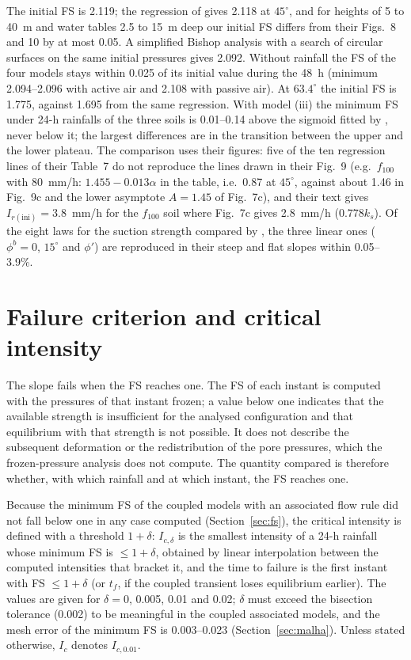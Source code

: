 \documentclass[preprint,12pt,authoryear]{elsarticle}
\newcommand{\Ic}{I_c}
\newcommand{\Icd}{I_{c,\delta}}
\begin{document}
The initial FS is 2.119; the regression of \citet[Table~7]{rahardjo2007} gives 2.118 at $45^\circ$, and for heights
of 5 to 40~m and water tables 2.5 to 15~m deep our initial FS differs from their Figs.~8 and 10 by at most 0.05. A
simplified Bishop analysis with a search of circular surfaces on the same initial pressures gives 2.092. Without
rainfall the FS of the four models stays within 0.025 of its initial value during the 48~h (minimum 2.094--2.096
with active air and 2.108 with passive air). At
$63.4^\circ$ the initial FS is 1.775, against 1.695 from the same regression. With model (iii) the minimum FS under
24-h rainfalls of the three soils is 0.01--0.14 above the sigmoid fitted by \citet[Eq.~6 and Fig.~7]{rahardjo2007},
never below it; the largest differences are in the transition between the upper and the lower plateau. The
comparison uses their figures: five of the ten regression lines of their Table~7 do not reproduce the lines drawn in
their Fig.~9 (e.g.\ $f_{100}$ with 80~mm/h: $1.455-0.013\alpha$ in the table, i.e.\ 0.87 at $45^\circ$, against about
1.46 in Fig.~9c and the lower asymptote $A=1.45$ of Fig.~7c), and their text gives $I_{r(\mathrm{ini})}=3.8$~mm/h
for the $f_{100}$ soil where Fig.~7c gives 2.8~mm/h ($0.778k_s$). Of the eight laws for the suction strength compared
by \citet[Tables~4 and 5]{zhang2014}, the three linear ones ($\phi^b=0$, $15^\circ$ and $\phi'$) are reproduced in
their steep and flat slopes within 0.05--3.9\%.

\section{Failure criterion and critical intensity}\label{sec:criterio}

The slope fails when the FS reaches one. The FS of each instant is computed with the pressures of that instant
frozen; a value below one indicates that the available strength is insufficient for the analysed configuration and
that equilibrium with that strength is not possible. It does not describe the subsequent deformation or the
redistribution of the pore pressures, which the frozen-pressure analysis does not compute. The quantity compared is
therefore whether, with which rainfall and at which instant, the FS reaches one.

Because the minimum FS of the coupled models with an associated flow rule did not fall below one in any case
computed (Section~\ref{sec:fs}), the critical intensity is defined with a threshold $1+\delta$: $\Icd$ is the smallest
intensity of a 24-h rainfall whose minimum FS is $\le1+\delta$, obtained by linear interpolation between the computed
intensities that bracket it, and the time to failure is the first instant with FS $\le1+\delta$ (or $t_f$, if the
coupled transient loses equilibrium earlier). The values are given for $\delta=0$, 0.005, 0.01 and 0.02; $\delta$ must
exceed the bisection tolerance (0.002) to be meaningful in the coupled associated models, and the mesh error of the
minimum FS is 0.003--0.023 (Section~\ref{sec:malha}). Unless stated otherwise, $\Ic$ denotes $I_{c,0.01}$.
\end{document}
